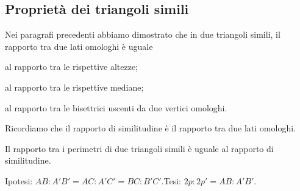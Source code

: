 \subsection{Proprietà dei triangoli simili}

Nei paragrafi precedenti abbiamo dimostrato che in due triangoli simili, il rapporto tra due lati omologhi è uguale
\begin{itemize*}
\noindent\begin{minipage}{0.35\textwidth}\parindent15pt
\item al rapporto tra le rispettive altezze;
\end{minipage}\hfil
\begin{minipage}{0.65\textwidth}
	\centering
\end{minipage}\vspace{5pt}
\noindent\begin{minipage}{0.35\textwidth}\parindent15pt
\item al rapporto tra le rispettive mediane;
\end{minipage}\hfil
\begin{minipage}{0.65\textwidth}
	\centering
\end{minipage}\vspace{5pt}
\noindent\begin{minipage}{0.35\textwidth}\parindent15pt
\item al rapporto tra le bisettrici uscenti da due vertici omologhi.
\end{minipage}\hfil
\begin{minipage}{0.65\textwidth}
	\centering
\end{minipage}\vspace{5pt}
\end{itemize*}

Ricordiamo che il rapporto di similitudine è il rapporto tra due lati omologhi.

\begin{teorema}\label{teo:6.3}%
Il rapporto tra i perimetri di due triangoli simili è uguale al rapporto di similitudine.
\end{teorema}

\noindent Ipotesi: $AB:A'B'=AC:A'C'=BC:B'C'$.\tab Tesi: $2p : 2p' = AB : A'B'$.

\begin{figure*}[!htb]
	\centering
\end{figure*}

